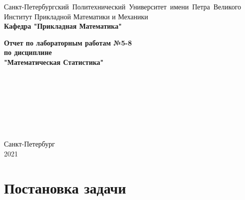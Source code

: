 \documentclass[a4paper]{article}
\author{Тырыкин Я. А. }
\date{March 2021}
\begin{document}
\begin{titlepage}
    \begin{center}
        \mbox{\normalsize{Санкт-Петербургский Политехнический Университет имени Петра Великого}}\\
        \normalsize{Институт Прикладной Математики и Механики}\\
        \large{\textbf{Кафедра "Прикладная Математика"}}
        
        \vfill
        
        \textbf{\Large{Отчет по лабораторным работам №5-8}}\\
        \textbf{\large{по дисциплине}}\\
        \textbf{\large"Математическая Статистика"}
        
        \vfill
        \\
        \\
        \\
        \\
        \\
        \\
        
        \vfill
    
    \end{center}
    
    \begin{center} 
        Санкт-Петербург \\
        2021 
    \end{center}
\end{titlepage}
\newpage

\begin{center}
    \tableofcontents
\end{center}
\setcounter{page}{2}
\newpage

\begin{center}
    \listoffigures
\end{center}
\newpage

\begin{center}
    \listoftables
\end{center}
\newpage


\section{Постановка задачи}
\end{document}
